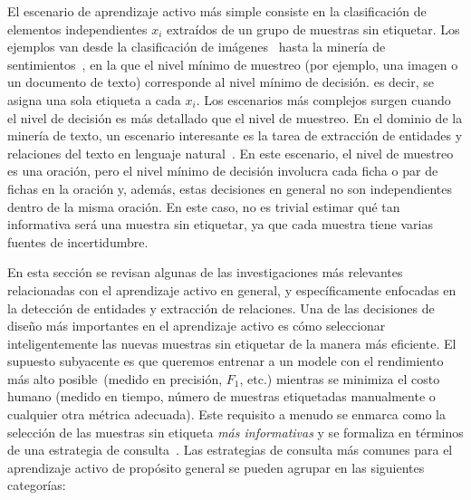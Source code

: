 El escenario de aprendizaje activo más simple consiste en la clasificación de elementos independientes $ x_i $ extraídos de un grupo de muestras sin etiquetar.
Los ejemplos van desde la clasificación de imágenes~\cite{Gal2017DeepBA} hasta la minería de sentimientos~\cite{Kranjc2015ActiveLF}, en la que el nivel mínimo de muestreo (por ejemplo, una imagen o un documento de texto) corresponde al nivel mínimo de decisión. es decir, se asigna una sola etiqueta a cada $ x_i $. Los escenarios más complejos surgen cuando el nivel de decisión es más detallado que el nivel de muestreo. En el dominio de la minería de texto, un escenario interesante es la tarea de extracción de entidades y relaciones del texto en lenguaje natural~\cite{zhang2012unified}.
En este escenario, el nivel de muestreo es una oración, pero el nivel mínimo de decisión involucra cada ficha o par de fichas en la oración y, además, estas decisiones en general no son independientes dentro de la misma oración.
En este caso, no es trivial estimar qué tan informativa será una muestra sin etiquetar, ya que cada muestra tiene varias fuentes de incertidumbre.

En esta sección se revisan algunas de las investigaciones más relevantes relacionadas con el aprendizaje activo en general, y específicamente enfocadas en la detección de entidades y extracción de relaciones.
Una de las decisiones de diseño más importantes en el aprendizaje activo es cómo seleccionar inteligentemente las nuevas muestras sin etiquetar de la manera más eficiente. El supuesto subyacente es que queremos entrenar a un
modele con el rendimiento más alto posible~(medido en precisión, $ F_1 $, etc.) mientras se minimiza el costo humano (medido en tiempo, número de muestras etiquetadas manualmente o cualquier otra métrica adecuada).
Este requisito a menudo se enmarca como la selección de las muestras sin etiqueta \textit{más informativas} y se formaliza en términos de una estrategia de consulta~\cite{seungquery}.
Las estrategias de consulta más comunes para el aprendizaje activo de propósito general se pueden agrupar en las siguientes categorías:

